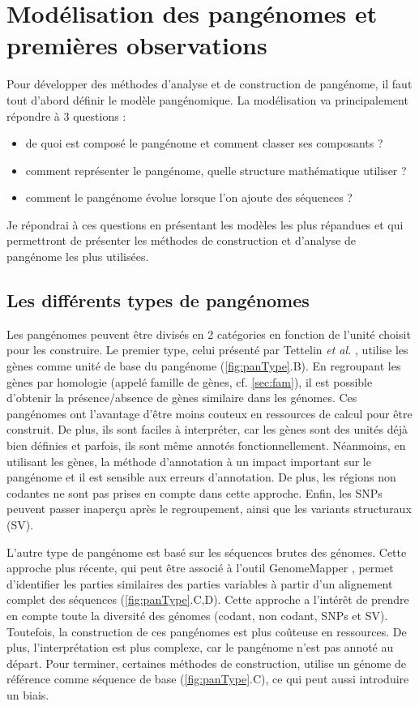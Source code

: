 \section{Modélisation des pangénomes et premières observations}
\label{sec:pan_model}

Pour développer des méthodes d'analyse et de construction de pangénome, il faut tout d'abord définir le modèle pangénomique. La modélisation va principalement répondre à 3 questions : 
\begin{itemize}
    \item de quoi est composé le pangénome et comment classer ses composants ?
    \item comment représenter le pangénome, quelle structure mathématique utiliser ? 
    \item comment le pangénome évolue lorsque l'on ajoute des séquences ? 
\end{itemize}

Je répondrai à ces questions en présentant les modèles les plus répandues et qui permettront de présenter les méthodes de construction et d'analyse de pangénome les plus utilisées. 

\subsection{Les différents types de pangénomes}

Les pangénomes peuvent être divisés en 2 catégories en fonction de l'unité choisit pour les construire. Le premier type, celui présenté par Tettelin \textit{et al.} \cite{tettelin_genome_2005}, utilise les gènes comme unité de base du pangénome (\autoref{fig:panType}.B). En regroupant les gènes par homologie (appelé famille de gènes, cf. \autoref{sec:fam}), il est possible d'obtenir la présence/absence de gènes similaire dans les génomes. Ces pangénomes ont l'avantage d'être moins couteux en ressources de calcul pour être construit. De plus, ils sont faciles à interpréter, car les gènes sont des unités déjà bien définies et parfois, ils sont même annotés fonctionnellement. Néanmoins, en utilisant les gènes, la méthode d'annotation à un impact important sur le pangénome et il est sensible aux erreurs d'annotation. De plus, les régions non codantes ne sont pas prises en compte dans cette approche. Enfin, les SNPs peuvent passer inaperçu après le regroupement, ainsi que les variants structuraux (SV).

L'autre type de pangénome est basé sur les séquences brutes des génomes. Cette approche plus récente, qui peut être associé à l'outil GenomeMapper \cite{schneeberger_simultaneous_2009}, permet d'identifier les parties similaires des parties variables à partir d'un alignement complet des séquences (\autoref{fig:panType}.C,D). Cette approche a l'intérêt de prendre en compte toute la diversité des génomes (codant, non codant, SNPs et SV). Toutefois, la construction de ces pangénomes est plus coûteuse en ressources. De plus, l'interprétation est plus complexe, car le pangénome n'est pas annoté au départ. Pour terminer, certaines méthodes de construction, utilise un génome de référence comme séquence de base (\autoref{fig:panType}.C), ce qui peut aussi introduire un biais.
    

